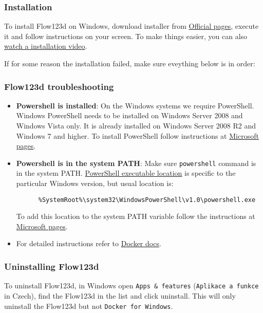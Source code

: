 \subsubsection{Installation}

To install Flow123d on Windows, download installer from \href{http://flow123d.github.io/}{Official pages}, execute it and follow instructions
on your screen. To make things easier, you can also \href{https://www.youtube.com/watch?v=xDR2vU-1IhM}{watch a installation video}.

If for some reason the installation failed, make sure eveything below is in order:


\subsubsection{Flow123d troubleshooting}

\begin{itemize}
  \item \textbf{Powershell is installed}: On the Windows systems we require PowerShell. Windows PowerShell needs to be installed on Windows Server 2008 and Windows Vista only.
  It is already installed on Windows Server 2008 R2 and Windows 7 and higher. To install PowerShell follow instructions at
  \href{https://msdn.microsoft.com/en-us/powershell/scripting/setup/installing-windows-powershell}{Microsoft pages}.

  \item \textbf{Powershell is in the system PATH}: Make sure \verb'powershell' command is in the system PATH.
  \href{http://www.powershelladmin.com/wiki/PowerShell_Executables_File_System_Locations}{PowerShell executable location}
   is specific to the particular Windows version, but usual location is:
   \begin{verbatim}
      %SystemRoot%\system32\WindowsPowerShell\v1.0\powershell.exe
   \end{verbatim}
   To add this location to the system PATH variable follow the instructions at
   \href{https://msdn.microsoft.com/en-us/library/office/ee537574(v=office.14).aspx}{Microsoft pages}.

   \item For detailed instructions refer to \href{https://docs.docker.com/docker-for-windows/}{Docker docs}.
\end{itemize}


\subsubsection{Uninstalling Flow123d}
To uninstall Flow123d, in Windows open \verb'Apps & features' (\verb'Aplikace a funkce' in Czech), find the Flow123d in the list
and click uninstall. This will only uninstall the Flow123d but not \verb'Docker for Windows'.


